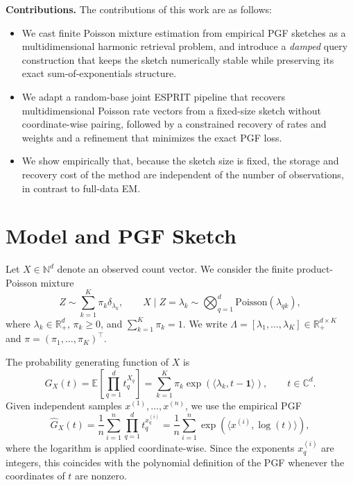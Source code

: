 \documentclass[sigconf,natbib=true,anonymous=true,review=true]{acmart}
\newcommand{\E}{\mathbb{E}}
\newcommand{\N}{\mathbb{N}}
\newcommand{\R}{\mathbb{R}}
\newcommand{\C}{\mathbb{C}}
\begin{document}
\textbf{Contributions.} 
The contributions of this work are as follows:
\begin{itemize}[leftmargin=*]
    \item We cast finite Poisson mixture estimation from empirical PGF sketches as a multidimensional harmonic retrieval problem, and introduce a \emph{damped} query construction that keeps the sketch numerically stable while preserving its exact sum-of-exponentials structure.
    \item We adapt a random-base joint ESPRIT pipeline that recovers multidimensional Poisson rate vectors from a fixed-size sketch without coordinate-wise pairing, followed by a constrained recovery of rates and weights and a refinement that minimizes the exact PGF loss.
    \item We show empirically that, because the sketch size is fixed, the storage and recovery cost of the method are independent of the number of observations, in contrast to full-data EM.
\end{itemize}

\section{Model and PGF Sketch}

Let $X \in \N^d$ denote an observed count vector. We consider the finite product-Poisson mixture
\begin{equation}
    Z \sim \sum_{k=1}^K \pi_k \delta_{\lambda_k},
    \qquad
    X \mid Z=\lambda_k \sim \bigotimes_{q=1}^d \mathrm{Poisson}(\lambda_{qk}),
    \label{eq:model}
\end{equation}
where $\lambda_k \in \R_+^d$, $\pi_k \geq 0$, and $\sum_{k=1}^K \pi_k=1$. We write
$\Lambda=[\lambda_1,\ldots,\lambda_K]\in\R_+^{d\times K}$ and
$\pi=(\pi_1,\ldots,\pi_K)^\top$.

The probability generating function of $X$ is
\begin{equation}
    G_X(t)
    =
    \E\!\left[\prod_{q=1}^d t_q^{X_q}\right]
    =
    \sum_{k=1}^K
    \pi_k
    \exp\!\left(\langle \lambda_k,t-\mathbf{1}\rangle\right),
    \qquad t\in\C^d.
    \label{eq:pgf}
\end{equation}
Given independent samples $x^{(1)},\ldots,x^{(n)}$, we use the empirical PGF
\begin{equation}
    \widehat G_X(t)
    =
    \frac1n
    \sum_{i=1}^n
    \prod_{q=1}^d t_q^{x_q^{(i)}}
    =
    \frac1n
    \sum_{i=1}^n
    \exp\!\left(\langle x^{(i)},\log(t)\rangle\right),
    \label{eq:empirical_pgf}
\end{equation}
where the logarithm is applied coordinate-wise. Since the exponents $x_q^{(i)}$ are integers, this coincides with the polynomial definition of the PGF whenever the coordinates of $t$ are nonzero.
\end{document}
